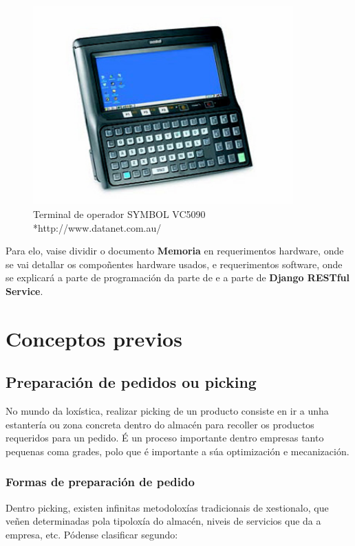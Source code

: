 \documentclass[11pt,twoside]{book}
\begin{document}
\begin{figure}[H]
	\begin{center}
		\includegraphics[width=10cm]{images/symbol_VC5090.jpg}
	\end{center}
	\caption{Terminal de operador SYMBOL VC5090 *http://www.datanet.com.au/}
	\label{fig:IoT}
\end{figure}

Para elo, vaise dividir o documento \textbf{Memoria} en requerimentos hardware, onde se vai detallar os compoñentes hardware usados, e requerimentos software, onde se explicará a parte de programación da parte de  e a parte de \textbf{Django RESTful Service}.

\chapter{Conceptos previos}

\section{Preparación de pedidos ou picking}

No mundo da loxística, realizar picking de un producto consiste en ir a unha estantería ou zona concreta dentro do almacén para recoller os productos requeridos para un pedido. É un proceso importante dentro empresas tanto pequenas coma grades, polo que é importante a súa optimización e mecanización.

\subsection{Formas de preparación de pedido}
Dentro picking, existen infinitas metodoloxías tradicionais de xestionalo, que veñen determinadas pola tipoloxía do almacén, niveis de servicios que da a empresa, etc. 
Pódense clasificar segundo:
\end{document}
